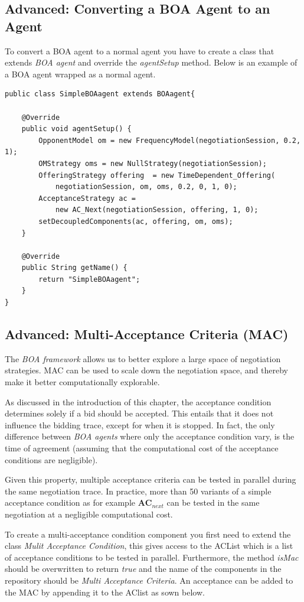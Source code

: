 \documentclass[]{article}
\begin{document}
\subsection{Advanced: Converting a BOA Agent to an Agent}
To convert a BOA agent to a normal agent you have to create a class that extends \textit{BOA agent} and override the \textit{agentSetup} method. Below is an example of a BOA agent wrapped as a normal agent.

\begin{lstlisting}
public class SimpleBOAagent extends BOAagent{

	@Override
	public void agentSetup() {
		OpponentModel om = new FrequencyModel(negotiationSession, 0.2, 1);
		OMStrategy oms = new NullStrategy(negotiationSession);
		OfferingStrategy offering  = new TimeDependent_Offering(
			negotiationSession, om, oms, 0.2, 0, 1, 0);
		AcceptanceStrategy ac = 
			new AC_Next(negotiationSession, offering, 1, 0);
		setDecoupledComponents(ac, offering, om, oms);		
	}

	@Override
	public String getName() {
		return "SimpleBOAagent";
	}
}
\end{lstlisting}

\subsection{Advanced: Multi-Acceptance Criteria (MAC)}
The \textit{BOA framework} allows us to better explore a large space of negotiation strategies. MAC can be used to scale down the negotiation space, and thereby make it better computationally explorable.

As discussed in the introduction of this chapter, the acceptance condition determines solely if a bid should be accepted. This entails that it does not influence the bidding trace, except for when it is stopped. In fact, the only difference between \textit{BOA agents} where only the acceptance condition vary, is the time of agreement (assuming that the computational cost of the acceptance conditions are negligible).

Given this property, multiple acceptance criteria can be tested in parallel during the same negotiation trace. In practice, more than 50 variants of a simple acceptance condition as for example $\textbf{AC}_{next}$ can be tested in the same negotiation at a negligible computational cost.

To create a multi-acceptance condition component you first need to extend the class \textit{Mulit Acceptance Condition}, this gives access to the ACList which is a list of acceptance conditions to be tested in parallel. Furthermore, the method \textit{isMac} should be overwritten to return \textit{true} and the name of the components in the repository should be \textit{Multi Acceptance Criteria}. An acceptance can be added to the MAC by appending it to the AClist as sown below. 
\end{document}

